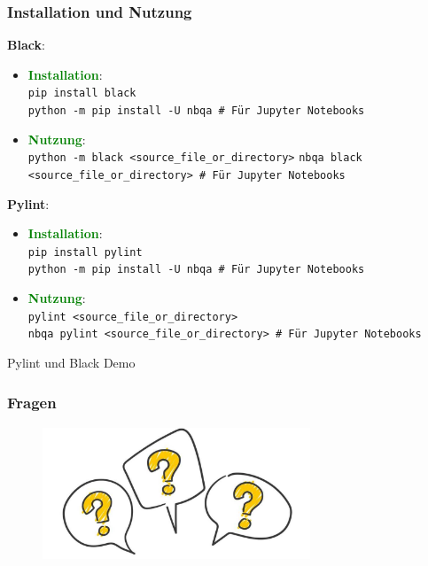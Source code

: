 \documentclass[10pt]{beamer}
\newcommand{\htgreen}[1] {{\bf \textcolor{Green}{#1}}}
\begin{document}
\begin{frame}[fragile]
  \frametitle{Installation und Nutzung}
  {\bf Black}:
  \begin{itemize}
    \item \htgreen{Installation}: \\
      \texttt{pip install black}\\
      \texttt{python -m pip install -U nbqa # Für Jupyter Notebooks}
    \item \htgreen{Nutzung}:\\
      \texttt{python -m black <source_file_or_directory>}
      \texttt{nbqa black <source_file_or_directory> # Für Jupyter Notebooks}
  \end{itemize}
  \vspace{0.5cm}

  {\bf Pylint}:
  \begin{itemize}
    \item \htgreen{Installation}: \\
      \texttt{pip install pylint}  \\
      \texttt{python -m pip install -U nbqa # Für Jupyter Notebooks}
    \item \htgreen{Nutzung}:\\
      \texttt{pylint <source_file_or_directory>}\\
      \texttt{nbqa pylint <source_file_or_directory> # Für Jupyter Notebooks}
  \end{itemize}
\end{frame}

\begin{frame}
    \Huge{\centerline{Pylint und Black Demo}}
\end{frame}


\begin{frame}
  \frametitle{Fragen}
  \begin{figure}
    \centerline{
      \includegraphics[width=8cm, height=4cm]{images/fragen.png}
    }
  \end{figure}
\end{frame}





\end{document}
